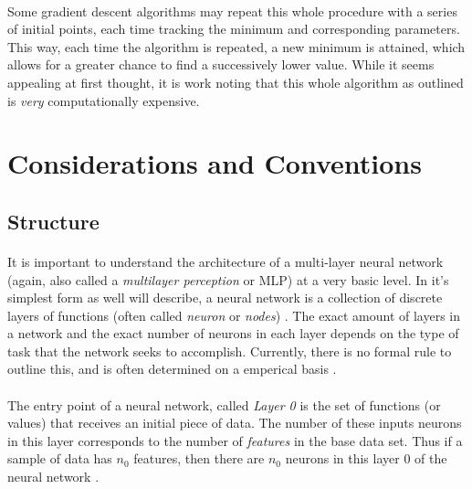 \documentclass[12pt,letterpaper]{article}
\begin{document}
\paragraph*{}Some gradient descent algorithms may repeat this whole procedure with a series of initial points, each time tracking the minimum and corresponding parameters. This way, each time the algorithm is repeated, a new minimum is attained, which allows for a greater chance to find a successively lower value. While it seems appealing at first thought, it is work noting that this whole algorithm as outlined is \textit{very} computationally expensive.
\paragraph*{}


\section{Considerations and Conventions}


\subsection{Structure}
\paragraph*{}It is important to understand the architecture of a multi-layer neural network (again, also called a \textit{multilayer perception} or MLP) at a very basic level. In it's simplest form as well will describe, a neural network is a collection of discrete layers of functions (often called \textit{neuron} or \textit{nodes}) \cite{Goodfellow}. The exact amount of layers in a network and the exact number of neurons in each layer depends on the type of task that the network seeks to accomplish. Currently, there is no formal rule to outline this, and is often determined on a emperical basis \cite{Geron}.
\paragraph*{}The entry point of a neural network, called \textit{Layer 0} is the set of functions (or values) that receives an initial piece of data. The number of these inputs neurons in this layer corresponds to the number of \textit{features} in the base data set. Thus if a sample of data has $n_0$ features, then there are $n_0$ neurons in this layer 0 of the neural network \cite{Geron}.
\end{document}

